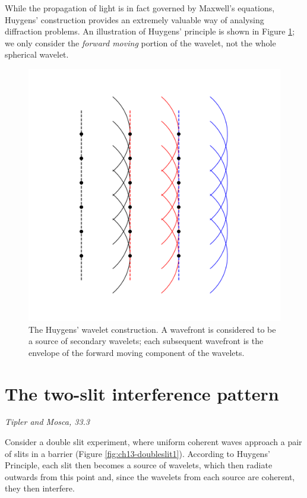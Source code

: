 \documentclass[
]{book}
\begin{document}
While the propagation of light is in fact governed by Maxwell's equations, Huygens' construction provides an extremely valuable way of analysing diffraction problems. An illustration of Huygens' principle is shown in Figure \ref{fig:ch13-huygenswavelets1}; we only consider the \emph{forward moving} portion of the wavelet, not the whole spherical wavelet.

\begin{figure}

{\centering \includegraphics[width=0.7\linewidth]{visualisations/ch13-huygenswavelets1} 

}

\caption{The Huygens' wavelet construction. A wavefront is considered to be a source of secondary wavelets; each subsequent wavefront is the envelope of the forward moving component of the wavelets.}\label{fig:ch13-huygenswavelets1}
\end{figure}

\hypertarget{sec-ch13-twoslitinterference}{%
\section{The two-slit interference pattern}\label{sec-ch13-twoslitinterference}}

\emph{Tipler and Mosca, 33.3}

Consider a double slit experiment, where uniform coherent waves approach a pair of slits in a barrier (Figure \ref{fig:ch13-doubleslit1}). According to Huygens' Principle, each slit then becomes a source of wavelets, which then radiate outwards from this point and, since the wavelets from each source are coherent, they then interfere.
\end{document}

